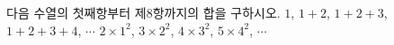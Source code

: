 다음 수열의 첫째항부터 제$8$항까지의 합을 구하시오.
 $1$, $1+2$, $1+2+3$, $1+2+3+4$, $\cdots$
 $2\times1^2$, $3\times2^2$, $4\times3^2$, $5\times4^2$, $\cdots$
